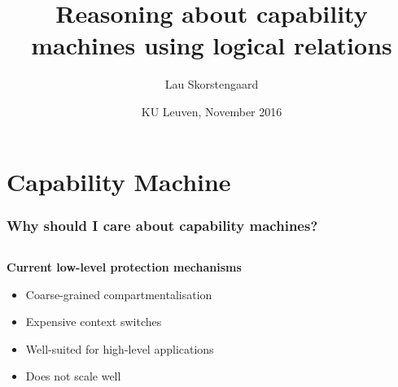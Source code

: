 \documentclass{beamer}
\title{Reasoning about capability machines using logical relations}
\author{Lau Skorstengaard}
\institute{Aarhus University}
\date{KU Leuven, November 2016}
\begin{document}
\frame{\titlepage}


\section{Capability Machine}
\begin{frame}
  \frametitle{ Why should I care about capability machines? }
  \begin{columns}
    \begin{column}{0.5\textwidth}
      \begin{overlayarea}{\textwidth}{8cm}
      \textbf{Current low-level protection mechanisms}
      \begin{itemize}
      \item Coarse-grained compartmentalisation
      \item Expensive context switches
      \item Well-suited for high-level applications
      \item Does not scale well
      \end{itemize}
    \end{overlayarea}
    \end{column}
    \begin{column}{0.5\textwidth}
      \begin{overlayarea}{\textwidth}{8cm}
      \end{overlayarea}
    \end{column}
\end{columns}
\end{frame}
\end{document}
